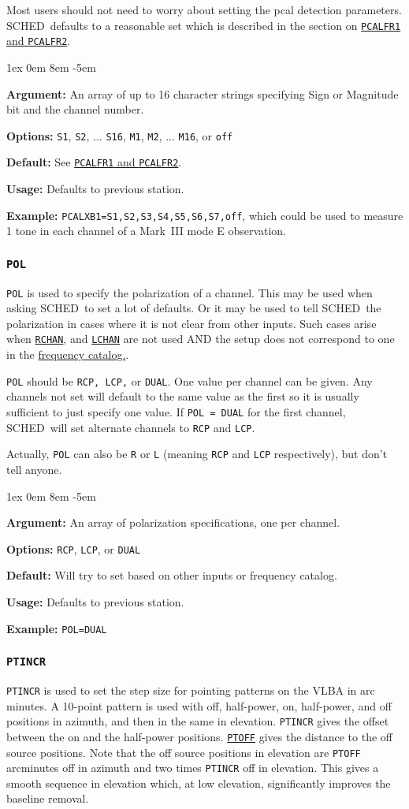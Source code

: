 \documentclass{report}
\newcommand{\schedb}{{\sc SCHED~}}
\newcommand{\rcwbox}[5]{
  \begin{list}{}{\parsep 1ex  \itemsep 0em
                 \leftmargin 8em  \itemindent -5em }
    \item {\bf Argument:} #1
    \item {\bf Options:}  #2
    \item {\bf Default:}  #3
    \item {\bf Usage:}    #4
    \item {\bf Example:}  #5
  \end{list}
}
\begin{document}
Most users should not need to worry about setting the pcal detection
parameters.  \schedb defaults to a reasonable set which is
described in the section on 
{\hyperref[SP:PCALFR1]{{\tt PCALFR1} and {\tt PCALFR2}}}.

\rcwbox
{An array of up to 16 character strings specifying Sign or
Magnitude bit and the channel number.}
{{\tt S1}, {\tt S2}, ... {\tt S16}, {\tt M1}, {\tt M2}, ...
{\tt M16}, or {\tt off}}
{See 
{\hyperref[SP:PCALFR1]{{\tt PCALFR1} and {\tt PCALFR2}}}.}
{Defaults to previous station.}
{{\tt PCALXB1=S1,S2,S3,S4,S5,S6,S7,off}, which could be used to
measure 1 tone in each channel of a Mark~III mode E observation.}

\subsubsection{\label{SP:POL}{\tt POL}}

{\tt POL} is used to specify the polarization of a channel.  This
may be used when asking \schedb to set a lot of defaults.  Or it
may be used to tell \schedb the polarization in cases where it
is not clear from other inputs.  Such cases arise when
{\hyperref[SP:LCHAN]{{\tt RCHAN}}}, and 
{\hyperref[SP:LCHAN]{{\tt LCHAN}}}
are not used AND the setup does not correspond to one in the
{\hyperref[SEC:FRQCAT]{frequency catalog.}}.

{\tt POL} should be {\tt RCP, LCP,} or {\tt DUAL}.  One value per
channel can be given.  Any channels not set will default to the
same value as the first so it is usually sufficient to just specify
one value.  If {\tt POL = DUAL} for the first channel,
\schedb will set alternate channels to {\tt RCP} and {\tt LCP}.

Actually, {\tt POL} can also be {\tt R} or {\tt L} (meaning {\tt RCP}
and {\tt LCP} respectively), but don't tell anyone.

\rcwbox
{An array of polarization specifications, one per channel.}
{{\tt RCP}, {\tt LCP}, or {\tt DUAL}}
{Will try to set based on other inputs or frequency catalog.}
{Defaults to previous station.}
{{\tt POL=DUAL}}


\subsubsection{\label{SP:PTINCR}{\tt PTINCR}}

{\tt PTINCR} is used to set the step size for pointing patterns on the
VLBA in arc minutes. A 10-point pattern is used with off, half-power,
on, half-power, and off positions in azimuth, and then in the same in
elevation.  {\tt PTINCR} gives the offset between the on and the
half-power positions. 
{\hyperref[SP:PTOFF]{{\tt PTOFF}}} gives the
distance to the off source positions.  Note that the off source
positions in elevation are {\tt PTOFF} arcminutes off in azimuth
and two times {\tt PTINCR} off in elevation.  This gives a smooth
sequence in elevation which, at low elevation, significantly
improves the baseline removal.
\end{document}
